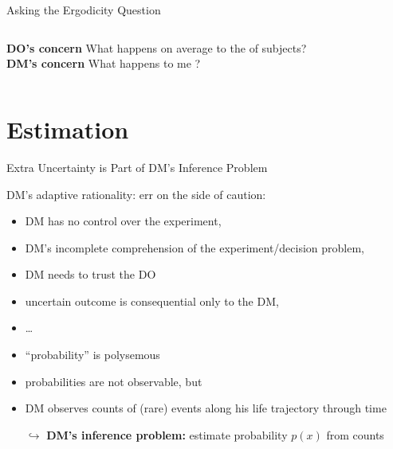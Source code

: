 \begin{frame}{Asking the Ergodicity Question}
\begin{columns}[T]
	\bc \textbf{DO's concern} \ec
	What happens on average to the  of subjects?
\centering \vspace{3em} \\ \red{\large $\neq$}
	\bc \textbf{DM's concern} \ec
	What happens to me ?
\end{columns}
\end{frame}


\section{Estimation}
\begin{frame}[allowframebreaks]{Extra Uncertainty is Part of DM's Inference Problem}

DM's adaptive rationality: err on the side of caution:
\begin{itemize}
  \item DM has no control over the experiment,
	\item DM's incomplete comprehension of the experiment/decision problem,
	\item DM needs to trust the DO
	\item uncertain outcome is consequential only to the DM,
	\item \ldots
\end{itemize}

\framebreak

\begin{itemize}
	\item ``probability'' is polysemous 
  \item probabilities are not observable, but
  \item DM observes counts of (rare) events along his life trajectory through time
  \item[$\hookrightarrow$] \textbf{DM's inference problem:} estimate probability $p(x)$ from counts
\end{itemize}
\end{frame}


